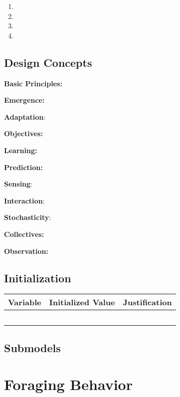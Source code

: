 \documentclass[
]{book}
\providecommand{\tightlist}{%
  \setlength{\itemsep}{0pt}\setlength{\parskip}{0pt}}
\begin{document}
\begin{enumerate}
\def\labelenumi{\arabic{enumi}.}
\tightlist
\item
\item
\item
\item
\end{enumerate}

\section{Design Concepts}\label{design-concepts-7}

\textbf{Basic Principles:}

\textbf{Emergence:}

\textbf{Adaptation}:

\textbf{Objectives:}

\textbf{Learning:}

\textbf{Prediction:}

\textbf{Sensing}:

\textbf{Interaction}:

\textbf{Stochasticity}:

\textbf{Collectives:}

\textbf{Observation:}

\section{Initialization}\label{initialization-7}

\begin{longtable}[]{@{}ccc@{}}
\toprule\noalign{}
Variable & Initialized Value & Justification \\
\midrule\noalign{}
\endhead
\bottomrule\noalign{}
\endlastfoot
& & \\
& & \\
& & \\
& & \\
& & \\
\end{longtable}

\section{Submodels}\label{submodels-7}

\chapter{Foraging Behavior}\label{foraging-behavior}
\end{document}
